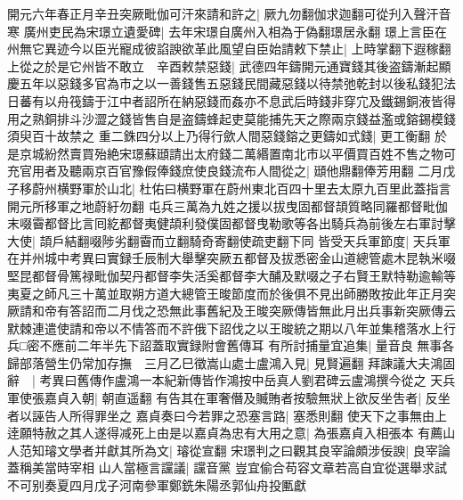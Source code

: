 開元六年春正月辛丑突厥毗伽可汗來請和許之|{
	厥九勿翻伽求迦翻可從刋入聲汗音寒}
廣州吏民為宋璟立遺愛碑|{
	去年宋璟自廣州入相為于偽翻璟居永翻}
璟上言臣在州無它異迹今以臣光寵成彼諂諛欲革此風望自臣始請敕下禁止|{
	上時掌翻下遐稼翻}
上從之於是它州皆不敢立　辛酉敕禁惡錢|{
	武德四年鑄開元通寶錢其後盗鑄漸起顯慶五年以惡錢多官為市之以一善錢售五惡錢民間藏惡錢以待禁弛乾封以後私錢犯法日蕃有以舟筏鑄于江中者詔所在納惡錢而姦亦不息武后時錢非穿宂及鐵錫銅液皆得用之熟銅排斗沙澀之錢皆售自是盗鑄蜂起吏莫能捕先天之際兩京錢益濫或鎔錫模錢須臾百十故禁之}
重二銖四分以上乃得行歛人間惡錢鎔之更鑄如式錢|{
	更工衡翻}
於是京城紛然賣買殆絶宋璟蘇頲請出太府錢二萬緡置南北市以平價買百姓不售之物可充官用者及聽兩京百官豫假俸錢庶使良錢流布人間從之|{
	頲他鼎翻俸芳用翻}
二月戊子移蔚州横野軍於山北|{
	杜佑曰横野軍在蔚州東北百四十里去太原九百里此蓋指言開元所移軍之地蔚紆勿翻}
屯兵三萬為九姓之援以拔曳固都督頡質略同羅都督毗伽末啜霫都督比言囘紇都督夷健頡利發僕固都督曳勒歌等各出騎兵為前後左右軍討擊大使|{
	頡戶結翻啜陟劣翻霫而立翻騎奇寄翻使疏吏翻下同}
皆受天兵軍節度|{
	天兵軍在并州城中考異曰實録壬辰制大舉擊突厥五都督及拔悉密金山道總管處木昆執米啜堅昆都督骨篤禄毗伽契丹都督李失活奚都督李大酺及默啜之子右賢王默特勒逾輸等夷夏之師凡三十萬並取朔方道大總管王晙節度而於後俱不見出師勝敗按此年正月突厥請和帝有答詔而二月伐之恐無此事舊紀及王晙突厥傳皆無此月出兵事新突厥傳云默棘連遣使請和帝以不情答而不許俄下詔伐之以王晙統之期以八年並集稽落水上行兵□密不應前二年半先下詔蓋取實録附會舊傳耳}
有所討捕量宜追集|{
	量音良}
無事各歸部落營生仍常加存撫　三月乙巳徵嵩山處士盧鴻入見|{
	見賢遍翻}
拜諫議大夫鴻固辭　|{
	考異曰舊傳作盧鴻一本紀新傳皆作鴻按中岳真人劉君碑云盧鴻撰今從之}
天兵軍使張嘉貞入朝|{
	朝直遥翻}
有告其在軍奢僭及贓賄者按驗無狀上欲反坐吿者|{
	反坐者以誣告人所得罪坐之}
嘉貞奏曰今若罪之恐塞言路|{
	塞悉則翻}
使天下之事無由上逹願特赦之其人遂得减死上由是以嘉貞為忠有大用之意|{
	為張嘉貞入相張本}
有薦山人范知璿文學者并獻其所為文|{
	璿從宣翻}
宋璟判之曰觀其良宰論頗涉佞諛|{
	良宰論蓋稱美當時宰相}
山人當極言讜議|{
	讜音黨}
豈宜偷合苟容文章若高自宜從選舉求試不可别奏夏四月戊子河南參軍鄭銑朱陽丞郭仙舟投匭獻

